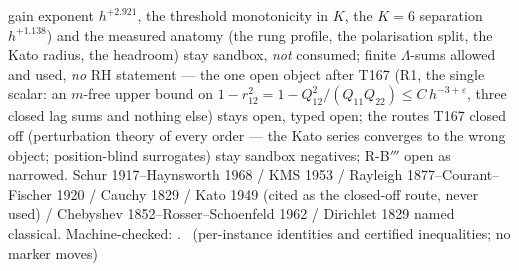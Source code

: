 gain exponent $h^{+2.921}$, the threshold monotonicity in $K$, the
$K=6$ separation $h^{+1.138}$) and the measured anatomy (the rung
profile, the polarisation split, the Kato radius, the headroom) stay
sandbox, \emph{not} consumed; finite $\Lambda$-sums allowed and used,
\emph{no} RH statement --- the one open object after T167 (R1, the
single scalar: an $m$-free upper bound on
$1-r_{12}^2=1-Q_{12}^2/(Q_{11}Q_{22})\le C\,h^{-3+\varepsilon}$, three
closed lag sums and nothing else) stays open, typed open; the routes
T167 closed off (perturbation theory of every order --- the Kato series
converges to the wrong object; position-blind surrogates) stay sandbox
negatives; R-B$'''$ open as narrowed.
Schur 1917--Haynsworth 1968 / KMS 1953 / Rayleigh 1877--Courant--Fischer
1920 / Cauchy 1829 / Kato 1949 (cited as the closed-off route, never
used) / Chebyshev 1852--Rosser--Schoenfeld 1962 / Dirichlet 1829 named
classical. Machine-checked:
.
\mE\ (per-instance identities and certified inequalities; no marker moves)
\par\smallskip


